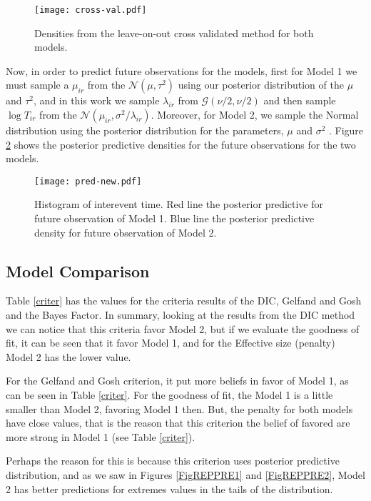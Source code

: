 \documentclass{asaproc}
\begin{document}
 
\begin{figure}[H]
\centering
\texttt{[image: cross-val.pdf]}
\caption{Densities from the leave-on-out cross validated method for both models.}
\label{cross}
\end{figure}

Now, in order to predict future observations for the models, first for Model 1 we must sample a $\mu_{ir}$ from the $\mathcal{N}(\mu, \tau^2)$ using our posterior distribution of the $\mu$ and $\tau^2$, and in this work we sample $\lambda_{ir}$ from $\mathcal{G}(\nu/2,\nu/2)$ and then sample $\log T_{ir}$ from the $\mathcal{N}(\mu_{ir}, \sigma^2/\lambda_{ir})$. Moreover, for Model 2, we sample the Normal distribution using the posterior distribution for the parameters, $\mu$ and $\sigma^2$ . Figure \ref{FigPRENEW} shows the posterior predictive densities for the future observations for the two models.
\begin{figure}[H]
\centering
\texttt{[image: pred-new.pdf]}
\caption{Histogram of interevent time. Red line the posterior predictive for future observation of Model 1. Blue line the posterior predictive density for future observation of Model 2.}
\label{FigPRENEW}
\end{figure}


\subsection{Model Comparison}

Table \ref{criter} has the values for the criteria results of the DIC, Gelfand and Gosh and the Bayes Factor. In summary, looking at the results from the DIC method we can notice that this criteria favor Model 2, but if we evaluate the goodness of fit, it can be seen that it favor Model 1, and for the Effective size (penalty) Model 2 has the lower value. 

For the Gelfand and Gosh criterion, it put more beliefs in favor of Model 1, as can be seen in Table \ref{criter}. For the goodness of fit, the Model 1 is a little smaller than Model 2, favoring Model 1 then. But, the penalty for both models have close values, that is the reason that this criterion the belief of favored are more strong in Model 1  (see Table \ref{criter}).

Perhaps the reason for this is because this criterion uses posterior predictive distribution, and as we saw in Figures \ref{FigREPPRE1} and \ref{FigREPPRE2}, Model 2 has better predictions for extremes values in the tails of the distribution.
\end{document}
